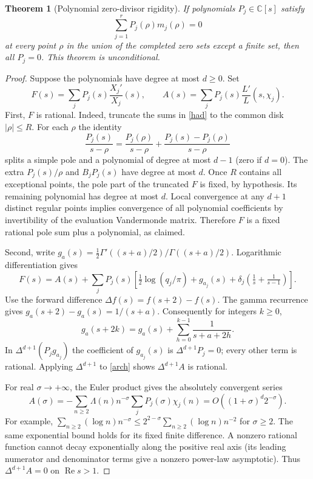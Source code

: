 \documentclass[11pt]{article}
\newtheorem{theorem}{Theorem}
\theoremstyle{remark}\newtheorem{remark}[theorem]{Remark}
\newcommand{\C}{\mathbb C}\newcommand{\R}{\mathbb R}\newcommand{\dd}{\mathrm d}\newcommand{\Rea}{\operatorname{Re}}\newcommand{\ord}{\operatorname{ord}}\newcommand{\diag}{\operatorname{diag}}\newcommand{\Span}{\operatorname{span}}
\begin{document}
\begin{theorem}[Polynomial zero-divisor rigidity]\label{rigidity}
If polynomials $P_j\in\C[s]$ satisfy
\[
 \sum_{j=1}^r P_j(\rho)m_j(\rho)=0
\]
at every point $\rho$ in the union of the completed zero sets except a finite set, then all $P_j=0$. This theorem is unconditional.
\end{theorem}
\begin{proof}
Suppose the polynomials have degree at most $d\ge0$. Set
\[
 F(s)=\sum_j P_j(s)\frac{X_j'}{X_j}(s),\qquad
 A(s)=\sum_j P_j(s)\frac{L'}{L}(s,\chi_j).
\]
First, $F$ is rational. Indeed, truncate the sums in \eqref{had} to the common disk $|\rho|\le R$. For each $\rho$ the identity
\[
 \frac{P_j(s)}{s-\rho}=\frac{P_j(\rho)}{s-\rho}+
 \frac{P_j(s)-P_j(\rho)}{s-\rho}
\]
splits a simple pole and a polynomial of degree at most $d-1$ (zero if $d=0$). The extra $P_j(s)/\rho$ and $B_jP_j(s)$ have degree at most $d$. Once $R$ contains all exceptional points, the pole part of the truncated $F$ is fixed, by hypothesis. Its remaining polynomial has degree at most $d$. Local convergence at any $d+1$ distinct regular points implies convergence of all polynomial coefficients by invertibility of the evaluation Vandermonde matrix. Therefore $F$ is a fixed rational pole sum plus a polynomial, as claimed.

Second, write $g_a(s)=\tfrac12\Gamma'((s+a)/2)/\Gamma((s+a)/2)$. Logarithmic differentiation gives
\begin{equation}\label{arch}
 F(s)=A(s)+\sum_j P_j(s)\left[\tfrac12\log(q_j/\pi)+g_{a_j}(s)+\delta_j\left(\tfrac1s+\tfrac1{s-1}\right)\right].
\end{equation}
Use the forward difference $\Delta f(s)=f(s+2)-f(s)$. The gamma recurrence gives $g_a(s+2)-g_a(s)=1/(s+a)$. Consequently for integers $k\ge0$,
\[
 g_a(s+2k)=g_a(s)+\sum_{h=0}^{k-1}\frac1{s+a+2h}.
\]
In $\Delta^{d+1}(P_jg_{a_j})$ the coefficient of $g_{a_j}(s)$ is $\Delta^{d+1}P_j=0$; every other term is rational. Applying $\Delta^{d+1}$ to \eqref{arch} shows $\Delta^{d+1} A$ is rational.

For real $\sigma\to+\infty$, the Euler product gives the absolutely convergent series
\begin{equation}\label{dirseries}
 A(\sigma)=-\sum_{n\ge2}\Lambda(n)n^{-\sigma}\sum_j P_j(\sigma)\chi_j(n)
 = O((1+\sigma)^d 2^{-\sigma}).
\end{equation}
For example, $\sum_{n\ge2}(\log n)n^{-\sigma}\le 2^{2-\sigma}\sum_{n\ge2}(\log n)n^{-2}$ for $\sigma\ge2$. The same exponential bound holds for its fixed finite difference. A nonzero rational function cannot decay exponentially along the positive real axis (its leading numerator and denominator terms give a nonzero power-law asymptotic). Thus $\Delta^{d+1} A=0$ on $\Rea s>1$.


\end{proof}
\end{document}
